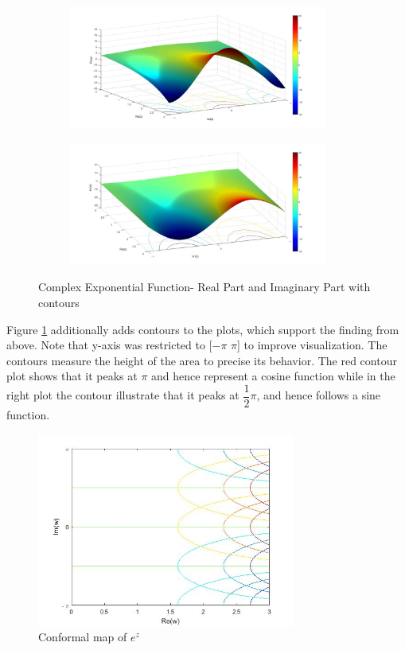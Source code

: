 \documentclass[a4paper,11pt]{article}
\begin{document}
\begin{figure}[!h]
\begin{subfigure}[c]{0.5\textwidth}
\includegraphics[width=8.5cm]{plot511.jpg}
\end{subfigure}
\begin{subfigure}[c]{0.5\textwidth}
\includegraphics[width=8.5cm]{plot6c.jpg}
\end{subfigure}
\caption{Complex Exponential Function- Real Part and Imaginary Part with contours}
\label{plot34}
\end{figure}
Figure \ref{plot34} additionally adds contours to the plots, which support the finding from above. Note that y-axis was restricted to [$-\pi$ $\pi$]  to improve  visualization.  The contours measure the height of the area to precise its behavior. The red contour plot shows that it peaks at $\pi$ and hence represent a cosine function while in the right plot the contour illustrate that it peaks at $\dfrac{1}{2}\pi$, and hence follows a sine function.
\begin{figure}[!h]
\begin{center}
\includegraphics[width=8.5cm]{plot4.jpg}
\caption{Conformal map of $e^z$}
\end{center}
\label{econf}
\end{figure}
\end{document}
